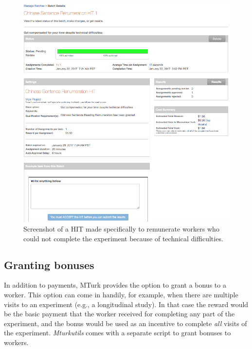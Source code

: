 \documentclass{article}
\begin{document}
\begin{figure}[htbp]
\begin{center}
\includegraphics[width=.9\textwidth]{figures/remuneration}
\caption{Screenshot of a HIT made specifically to remunerate workers who could not complete the experiment because of technical difficulties.}
\label{default}
\end{center}
\end{figure}

\subsection{Granting bonuses}

In addition to payments, MTurk provides the option to grant a bonus to a worker. This option can come in handily, for example, when there are multiple visits to an experiment (e.g., a longitudinal study). In that case the reward would be the basic payment that the worker received for completing any part of the experiment, and the bonus would be used as an incentive to complete {\em all} visits of the experiment. {\em Mturkutils} comes with a separate script to grant bonuses to workers.
\end{document}
